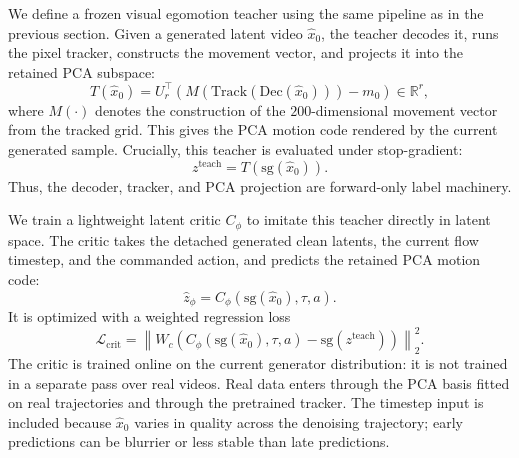 \documentclass[letterpaper]{article} %
\begin{document}
We define a frozen visual egomotion teacher using the same pipeline as in the previous section. Given a generated latent video \(\hat{x}_0\), the teacher decodes it, runs the pixel tracker, constructs the movement vector, and projects it into the retained PCA subspace:
\begin{equation}
    T(\hat{x}_0)
    =
    U_r^\top
    \left(
        M\left(
            \mathrm{Track}
            \left(
                \mathrm{Dec}(\hat{x}_0)
            \right)
        \right)
        -
        m_0
    \right)
    \in\mathbb{R}^{r},
    \label{eq:visual_teacher}
\end{equation}
where \(M(\cdot)\) denotes the construction of the \(200\)-dimensional movement vector from the tracked grid. This gives the PCA motion code rendered by the current generated sample. Crucially, this teacher is evaluated under stop-gradient:
\begin{equation}
    z^{\mathrm{teach}} = T(\mathrm{sg}(\hat{x}_0)).
    \label{eq:teacher_readout}
\end{equation}
Thus, the decoder, tracker, and PCA projection are forward-only label machinery.

We train a lightweight latent critic \(C_\phi\) to imitate this teacher directly in latent space. The critic takes the detached generated clean latents, the current flow timestep, and the commanded action, and predicts the retained PCA motion code:
\begin{equation}
    \hat{z}_{\phi}
    =
    C_\phi(\mathrm{sg}(\hat{x}_0),\tau,a).
\end{equation}
It is optimized with a weighted regression loss
\begin{equation}
    \mathcal{L}_{\mathrm{crit}}
    =
    \left\|
        W_c
        \left(
            C_\phi(\mathrm{sg}(\hat{x}_0),\tau,a)
            -
            \mathrm{sg}(z^{\mathrm{teach}})
        \right)
    \right\|_2^2 .
    \label{eq:critic_loss}
\end{equation}
The critic is trained online on the current generator distribution: it is not trained in a separate pass over real videos. Real data enters through the PCA basis fitted on real trajectories and through the pretrained tracker. The timestep input is included because \(\hat{x}_0\) varies in quality across the denoising trajectory; early predictions can be blurrier or less stable than late predictions.
\end{document}
